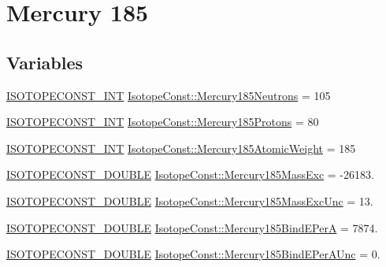 \hypertarget{group___isotope_const-_mercury-_hg185}{}\section{Mercury 185}
\label{group___isotope_const-_mercury-_hg185}
\subsection*{Variables}
\begin{DoxyCompactItemize}
\item 
\mbox{\hyperlink{group___isotope_const-_macros_ga5f18360b3e99483a35c32d789e62621c}{I\+S\+O\+T\+O\+P\+E\+C\+O\+N\+S\+T\+\_\+\+I\+NT}} \mbox{\hyperlink{group___isotope_const-_mercury-_hg185_gaf9e31f9636b1c4852fb7fb64d160bd60}{Isotope\+Const\+::\+Mercury185\+Neutrons}} = 105
\item 
\mbox{\hyperlink{group___isotope_const-_macros_ga5f18360b3e99483a35c32d789e62621c}{I\+S\+O\+T\+O\+P\+E\+C\+O\+N\+S\+T\+\_\+\+I\+NT}} \mbox{\hyperlink{group___isotope_const-_mercury-_hg185_ga94ee469e857d239c5c01b8712ae7d43a}{Isotope\+Const\+::\+Mercury185\+Protons}} = 80
\item 
\mbox{\hyperlink{group___isotope_const-_macros_ga5f18360b3e99483a35c32d789e62621c}{I\+S\+O\+T\+O\+P\+E\+C\+O\+N\+S\+T\+\_\+\+I\+NT}} \mbox{\hyperlink{group___isotope_const-_mercury-_hg185_ga4dceac49e21e9b6b1512a45008ed9f0e}{Isotope\+Const\+::\+Mercury185\+Atomic\+Weight}} = 185
\item 
\mbox{\hyperlink{group___isotope_const-_macros_ga8f45a7272ce02c0b4c65c44636ed719a}{I\+S\+O\+T\+O\+P\+E\+C\+O\+N\+S\+T\+\_\+\+D\+O\+U\+B\+LE}} \mbox{\hyperlink{group___isotope_const-_mercury-_hg185_ga92428b1df3c99e8eb310743401c948a9}{Isotope\+Const\+::\+Mercury185\+Mass\+Exc}} = -\/26183.
\item 
\mbox{\hyperlink{group___isotope_const-_macros_ga8f45a7272ce02c0b4c65c44636ed719a}{I\+S\+O\+T\+O\+P\+E\+C\+O\+N\+S\+T\+\_\+\+D\+O\+U\+B\+LE}} \mbox{\hyperlink{group___isotope_const-_mercury-_hg185_ga9f1a0cd2883d80c11db7fc27e89fa2ea}{Isotope\+Const\+::\+Mercury185\+Mass\+Exc\+Unc}} = 13.
\item 
\mbox{\hyperlink{group___isotope_const-_macros_ga8f45a7272ce02c0b4c65c44636ed719a}{I\+S\+O\+T\+O\+P\+E\+C\+O\+N\+S\+T\+\_\+\+D\+O\+U\+B\+LE}} \mbox{\hyperlink{group___isotope_const-_mercury-_hg185_gaaca66a9b3a1011f64d96380fbdf8da57}{Isotope\+Const\+::\+Mercury185\+Bind\+E\+PerA}} = 7874.
\item 
\mbox{\hyperlink{group___isotope_const-_macros_ga8f45a7272ce02c0b4c65c44636ed719a}{I\+S\+O\+T\+O\+P\+E\+C\+O\+N\+S\+T\+\_\+\+D\+O\+U\+B\+LE}} \mbox{\hyperlink{group___isotope_const-_mercury-_hg185_ga9acc780d791c6b3b9b852c0b9348faf6}{Isotope\+Const\+::\+Mercury185\+Bind\+E\+Per\+A\+Unc}} = 0.

\end{DoxyCompactItemize}

